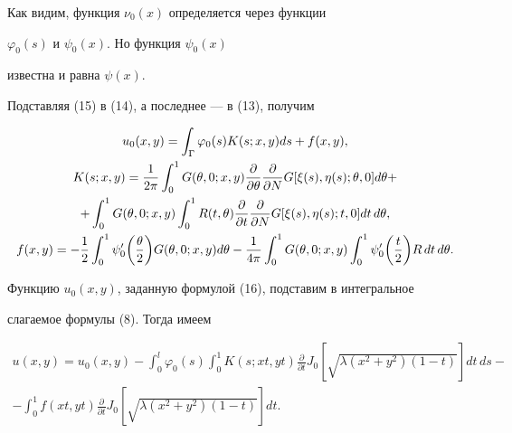 Как видим, функция $\nu_0(x)$ определяется через функции


$\varphi_0(s)$ и $\psi_0(x)$. Но функция $\psi_0(x)$


известна и равна $\psi (x)$.





Подставляя (15) в (14), а последнее --- в (13), получим


\begin{gather}


u_0(x,y)=\int_\Gamma \varphi_0(s)K(s;x,y)ds+f(x,y),\\


%


K(s;x,y)=\frac {1}{2\pi }\int_0^1G(\theta,0;x,y) \frac {\partial }


{\partial \theta}\frac {\partial }


{\partial N}G[\xi (s),\eta (s);\theta ,0]d\theta + \notag \\


%


+\int_0^1 G(\theta ,0;x,y)\int_0^1R(t,\theta)\frac {\partial }


{\partial t}\frac {\partial }


{\partial N}G[\xi (s),\eta (s);t,0]dt\,d\theta, \notag \\


%


f(x,y)=-\frac {1}{2}\int_0^1\psi '_0\bigg(\frac{\theta }{2}\bigg)


G(\theta ,0;x,y)d\theta -\frac {1}{4\pi }


\int_0^1 G(\theta ,0;x,y)\int_0^1\psi '_0


\bigg(\frac{t}{2}\bigg)R\,dt\,d\theta.\notag


\end{gather}


Функцию $u_0(x,y)$, заданную формулой (16), подставим в интегральное


слагаемое формулы (8). Тогда имеем


\begin{multline}


u(x,y)=u_0(x,y)-\int_0^l \varphi_0(s)\int_0^1 K(s;xt,yt)\frac {\partial }


{\partial t}J_0[\sqrt {\lambda (x^2+y^2)(1-t)}]dt\,ds-\\


%


-\int_0^1 f(xt,yt)\frac {\partial }


{\partial t}J_0[\sqrt {\lambda (x^2+y^2)(1-t)}]dt.


\end{multline}


